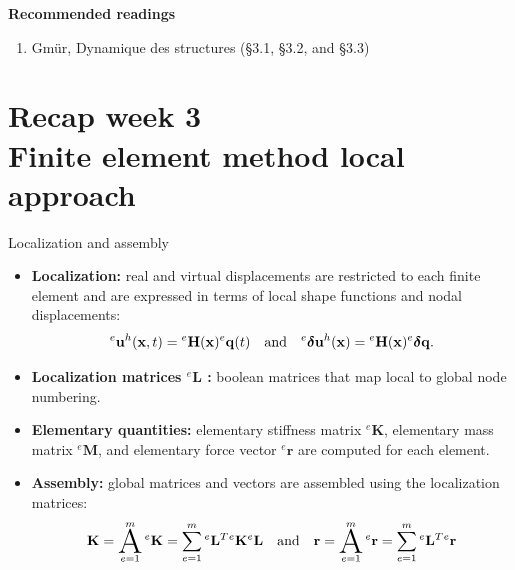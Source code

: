 \documentclass[aspectratio=169]{beamer}
\begin{document}
{\begin{frame}
        \vspace{.5cm}

        \textbf{\large Recommended readings}
        \begin{enumerate}
            \item Gmür, Dynamique des structures (§3.1, §3.2, and §3.3)
        \end{enumerate}
    \end{frame}
}

\section{Recap week 3 \\ Finite element method local approach}
 {


  \begin{frame}{Localization and assembly}
      \begin{itemize}
          \item \textbf{Localization:} real and virtual displacements are restricted to each finite element and are expressed in terms of local shape functions and nodal displacements:
                $$
                    {}^e\mathbf{u}^h(\mathbf{x}, t) = {}^e\mathbf{H}(\mathbf{x}) {}^e\mathbf{q}(t) \quad\text{and}\quad {}^e\boldsymbol\delta \mathbf{u}^h(\mathbf{x}) = {}^e\mathbf{H}(\mathbf{x}) ^e\boldsymbol\delta\mathbf{q}.
                $$
          \item \textbf{Localization matrices \( {}^e\mathbf{L} \) :} boolean matrices that map local to global node numbering.
          \item \textbf{Elementary quantities:} elementary stiffness matrix \( {}^e\mathbf{K} \), elementary mass matrix \( {}^e\mathbf{M} \), and elementary force vector \( {}^e\mathbf{r} \) are computed for each element.

          \item \textbf{Assembly:} global matrices and vectors are assembled using the localization matrices:
                \[
                    \mathbf K =\A_{e=1}^m {}^e\mathbf K = \sum_{e=1}^{m} {}^e\mathbf L^T {}^e\mathbf K{}^e\mathbf L \quad\text{and}\quad  \mathbf r =\A_{e=1}^m {}^e\mathbf r = \sum_{e=1}^{m} {}^e\mathbf L^T {}^e\mathbf r
                \]
      \end{itemize}
  \end{frame}

}
\end{document}
